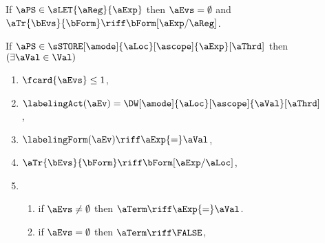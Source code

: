 \begin{figure}

  \noindent
  If $\aPS\in\sLET{\aReg}{\aExp}$ then $\aEvs = \emptyset$ and
  $\aTr{\bEvs}{\bForm} \riff \bForm[\aExp/\aReg]$.
  \medskip

  \noindent
  If $\aPS \in \sSTORE[\amode]{\aLoc}[\ascope]{\aExp}[\aThrd]$ then
  $(\exists\aVal\in\Val)$
  \begin{multicols}{2}
    \begin{enumerate}[topsep=0pt,label=(\textsc{w}\arabic*),ref=\textsc{w}\arabic*]
    \item \label{write-E}
      $\fcard{\aEvs}\leq1$,
    \item \label{write-lambda}
      $\labelingAct(\aEv) = \DW[\amode]{\aLoc}[\ascope]{\aVal}[\aThrd]$,
    \item \label{write-kappa}
      \begin{math}
        \labelingForm(\aEv) \riff
        \aExp{=}\aVal
      \end{math},    
    \item \label{write-tau}
      \begin{math}
        \aTr{\bEvs}{\bForm} \riff 
        \bForm[\aExp/\aLoc]
      \end{math},
    \item[] \setcounter{enumi}{\value{term}} 
      \begin{enumerate}[leftmargin=0pt]
      \item \label{write-term-nonempty}
        if $\aEvs\neq\emptyset$ then $\aTerm \riff \aExp{=}\aVal$.
      \item \label{write-term-empty}
        if $\aEvs=\emptyset$ then $\aTerm \riff \FALSE$,
      \end{enumerate}
    \end{enumerate}
  \end{multicols}
  \medskip
  

\end{figure}
